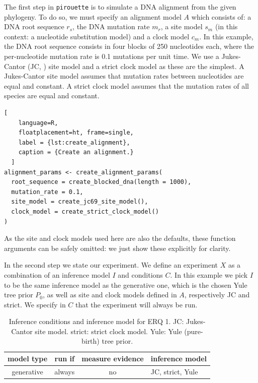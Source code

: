 \documentclass{article}
\begin{document}
The first step in \verb;pirouette; is to simulate a DNA alignment from the 
given phylogeny. 
To do so, we must specify an alignment model $\mathit{A}$ which consists of: a 
DNA root sequence $\mathit{r_{s}}$, the DNA mutation rate $\mathit{m_{r}}$, a
site model $\mathit{s_{m}}$ (in this context: a nucleotide substitution model) 
and a clock model $\mathit{c_{m}}$. 
In this example, the DNA root sequence consists in four blocks of 250 
nucleotides each, 
where the per-nucleotide mutation rate is 0.1 mutations per unit time.
We use a Jukes-Cantor (JC, \cite{jukes1969evolution}) site model
and a strict clock model as these are the simplest.
A Jukes-Cantor site model
assumes that mutation rates between nucleotides are equal and constant. 
A strict clock model assumes that the mutation rates 
of all species are equal and constant.

\begin{lstlisting}[
    language=R,
    floatplacement=ht, frame=single,
    label = {lst:create_alignment}, 
    caption = {Create an alignment.}
  ]
alignment_params <- create_alignment_params(
  root_sequence = create_blocked_dna(length = 1000),
  mutation_rate = 0.1,
  site_model = create_jc69_site_model(),
  clock_model = create_strict_clock_model()
)
\end{lstlisting}

As the site and clock models used here are also the defaults, 
these function arguments can be safely omitted: we just show these
explicitly for clarity.

In the second step we state our experiment.
We define an experiment $\mathit{X}$ as a combination of an inference model 
$\mathit{I}$
and conditions $\mathit{C}$.
In this example we pick $\mathit{I}$ to be the same inference model as the 
generative one,
which is the chosen Yule tree prior $\mathit{P_{0}}$, as well as site and clock 
models defined in $\mathit{A}$, respectively JC and strict.
We specify in $\mathit{C}$ that the experiment will always be run.

\begin{table}
  \begin{tabular}{ | c | c | c | l | }
    \hline
    \textbf{model type} & \textbf{run if} & \textbf{measure evidence} & 
\textbf{inference model} \\ 
    \hline
    generative & always & no & JC, strict, Yule \\
    \hline
  \end{tabular}
  \caption{
    Inference conditions and inference model for ERQ 1.
    JC: Jukes-Cantor site model.
    strict: strict clock model.
    Yule: Yule (pure-birth) tree prior.
  }
  \label{tab:RQ1}
\end{table}
\end{document}
